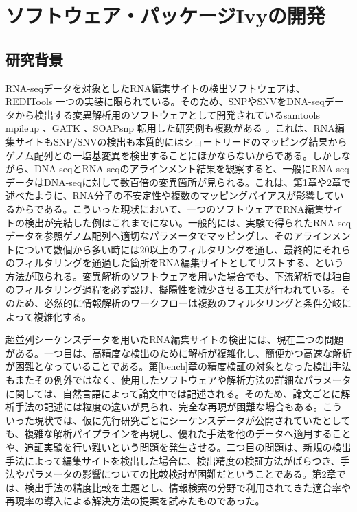 \chapter{ソフトウェア・パッケージIvyの開発}
\section{研究背景}
RNA-seqデータを対象としたRNA編集サイトの検出ソフトウェアは、REDITools \citep{Picardi:2013aa}一つの実装に限られている。そのため、SNPやSNVをDNA-seqデータから検出する変異解析用のソフトウェアとして開発されているsamtools mpileup \citep{Li:2009aa}、GATK \citep{McKenna:2010aa}、SOAPsnp \citep{Yu:2013aa}転用した研究例も複数がある \citep{Danecek:2012aa, Chen:2012aa, Sanjana:2012aa, Peng:2012aa}。これは、RNA編集サイトもSNP/SNVの検出も本質的にはショートリードのマッピング結果からゲノム配列との一塩基変異を検出することにほかならないからである。しかしながら、DNA-seqとRNA-seqのアラインメント結果を観察すると、一般にRNA-seqデータはDNA-seqに対して数百倍の変異箇所が見られる。これは、第1章や2章で述べたように、RNA分子の不安定性や複数のマッピングバイアスが影響しているからである。こういった現状において、一つのソフトウェアでRNA編集サイトの検出が完結した例はこれまでにない。一般的には、実験で得られたRNA-seqデータを参照ゲノム配列へ適切なパラメータでマッピングし、そのアラインメントについて数個から多い時には20以上のフィルタリングを通し、最終的にそれらのフィルタリングを通過した箇所をRNA編集サイトとしてリストする、という方法が取られる。変異解析のソフトウェアを用いた場合でも、下流解析では独自のフィルタリング過程を必ず設け、擬陽性を減少させる工夫が行われている。そのため、必然的に情報解析のワークフローは複数のフィルタリングと条件分岐によって複雑化する。
\par
超並列シーケンスデータを用いたRNA編集サイトの検出には、現在二つの問題がある。一つ目は、高精度な検出のために解析が複雑化し、簡便かつ高速な解析が困難となっていることである。第\ref{bench}章の精度検証の対象となった検出手法もまたその例外ではなく、使用したソフトウェアや解析方法の詳細なパラメータに関しては、自然言語によって論文中では記述される。そのため、論文ごとに解析手法の記述には粒度の違いが見られ、完全な再現が困難な場合もある。こういった現状では、仮に先行研究ごとにシーケンスデータが公開されていたとしても、複雑な解析パイプラインを再現し、優れた手法を他のデータへ適用することや、追証実験を行い難いという問題を発生させる。二つ目の問題は、新規の検出手法によって編集サイトを検出した場合に、検出精度の検証方法がばらつき、手法やパラメータの影響についての比較検討が困難だということである。第2章では、検出手法の精度比較を主題とし、情報検索の分野で利用されてきた適合率や再現率の導入による解決方法の提案を試みたものであった。
